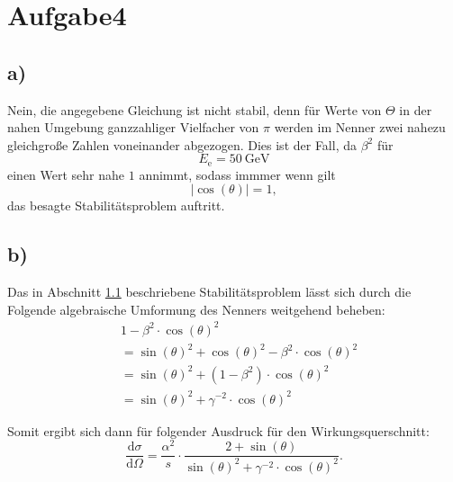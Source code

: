 \newpage
\section{Aufgabe4}
\label{sec:a4}

\subsection{a)}
\label{subsec:a4a}
Nein, die angegebene Gleichung ist nicht stabil, denn für Werte von $\Theta$ in der nahen Umgebung ganzzahliger Vielfacher von $\pi$ werden im Nenner zwei
nahezu gleichgroße Zahlen voneinander abgezogen. Dies ist der Fall, da $\beta^{2}$ für
\\
\begin{equation}
  \label{eqn:a4af1}
  E_\text{e} = \SI{50}{\giga\electronvolt}
\end{equation}
einen Wert sehr nahe $1$ annimmt, sodass immmer wenn gilt
\\
\begin{equation}
  \label{eqn:a4af2}
  \lvert \cos\left( \theta \right) \rvert = 1,
\end{equation}
das besagte Stabilitätsproblem auftritt.

\subsection{b)}
\label{subsec:a4b}
Das in Abschnitt \ref{subsec:a4a} beschriebene Stabilitätsproblem lässt sich durch die Folgende algebraische Umformung des Nenners weitgehend beheben:
\\
\begin{align}
  \label{eqn:a4bf1}
  &1 - \beta^{2} \cdot \cos\left( \theta \right)^{2}\\
  &=\sin\left( \theta \right)^{2} + \cos\left( \theta \right)^{2} - \beta^{2} \cdot \cos\left( \theta \right)^{2} \\
  &=\sin\left( \theta \right)^{2} + (1 - \beta^{2}) \cdot \cos\left( \theta \right)^{2}\\
  &=\sin\left( \theta \right)^{2} + \gamma^{-2} \cdot \cos\left( \theta \right)^{2}
\end{align}

Somit ergibt sich dann für folgender Ausdruck für den Wirkungsquerschnitt:
\\
\begin{equation}
  \label{eqn:a4bf2}
  \frac{\text{d}\sigma}{\text{d}\Omega} = \frac{\alpha^{2}}{s} \cdot \frac{2 + \sin\left( \theta \right)}{\sin\left( \theta \right)^{2} + \gamma^{-2} \cdot \cos\left( \theta \right)^{2}}.
\end{equation}

